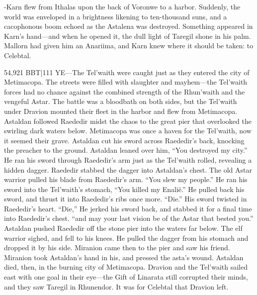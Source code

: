 \documentclass[smalldemyvopaper,11pt,twoside,onecolumn,openright,extrafontsizes]{memoir}
\newlength\drop
\begin{document}
-Karn flew from Ithalas upon the back of Voronwe to a harbor. Suddenly, the world was enveloped in a brightness likening to ten-thousand suns, and a cacophonous boom echoed as the Astalena was destroyed. Something appeared in Karn’s hand—and when he opened it, the dull light of Taregil shone in his palm. Mallorn had given him an Anariima, and Karn knew where it should be taken: to Celebtal. 

54,921 BBT|111 YE—The Tel’waith were caught just as they entered the city of Metimacopa. The streets were filled with slaughter and mayhem—the Tel’waith forces had no chance against the combined strength of the Rhun’waith and the vengeful Astar. The battle was a bloodbath on both sides, but the Tel’waith under Dravion mounted their fleet in the harbor and flew from Metimacopa. Astaldan followed Raededir midst the chaos to the great pier that overlooked the swirling dark waters below. Metimacopa was once a haven for the Tel’waith, now it seemed their grave. Astaldan cut his sword across Raededir’s back, knocking the preacher to the ground. Astaldan leaned over him,
“You destroyed my city.”
He ran his sword through Raededir’s arm just as the Tel’waith rolled, revealing a hidden dagger. Raededir stabbed the dagger into Astaldan’s chest. The old Astar warrior pulled his blade from Raededir’s arm.
“You slew my people.”
He ran his sword into the Tel’waith’s stomach,
“You killed my Enalië.”
He pulled back his sword, and thrust it into Raededir’s ribs once more.
“Die.”
His sword twisted in Raededir’s heart.
“Die,”
He jerked his sword back, and stabbed it for a final time into Raededir’s chest.
“and may your last vision be of the Astar that bested you.”
Astaldan pushed Raededir off the stone pier into the waters far below. The elf warrior sighed, and fell to his knees. He pulled the dagger from his stomach and dropped it by his side. Miranion came then to the pier and saw his friend. Miranion took Astaldan’s hand in his, and pressed the asta’s wound. Astaldan died, then, in the burning city of Metimacopa. Dravion and the Tel’waith sailed east with one goal in their eye—the Gift of Linarata still corrupted their minds, and they saw Taregil in Rhunendor. It was for Celebtal that Dravion left.
\end{document}
